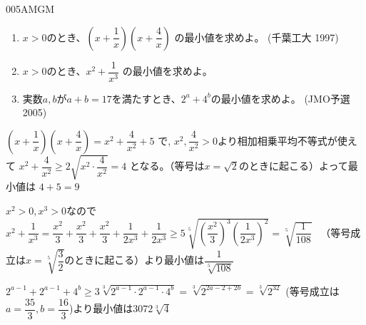 \begin{prob}{005}{}{AMGM}
 \begin{enumerate}
  \item $x>0$のとき、$\left(x+\dfrac{1}{x}\right)\left(x+\dfrac{4}{x}\right)$ の最小値を求めよ。 (千葉工大 1997)
  \item $x>0$のとき、$x^2+\dfrac{1}{x^3}$ の最小値を求めよ。
  \item 実数$a,b$が$a+b=17$を満たすとき、$2^a+4^b$の最小値を求めよ。 (JMO予選 2005)
 \end{enumerate}
\end{prob}
$\left(x+\dfrac{1}{x}\right)\left(x+\dfrac{4}{x}\right)=x^2+\dfrac{4}{x^2}+5$ で, $x^2,\dfrac{4}{x^2}>0$より相加相乗平均不等式が使えて $x^2+\dfrac{4}{x^2}\geq 2\sqrt{x^2\cdot \dfrac{4}{x^2}}=4$ となる。（等号は$x=\sqrt{2}$のときに起こる）よって最小値は $4+5=9$

$x^2>0, x^3>0$なので$x^2+\dfrac{1}{x^3}=\dfrac{x^2}{3}+\dfrac{x^2}{3}+\dfrac{x^2}{3}+\dfrac{1}{2x^3}+\dfrac{1}{2x^3}\geq 5\sqrt[5]{\left(\dfrac{x^2}{3}\right)^3\left(\dfrac{1}{2x^3}\right)^2}=\sqrt[5]{\dfrac{1}{108}}$ 　（等号成立は$x=\sqrt[5]{\dfrac{3}{2}}$のときに起こる）より最小値は$\dfrac{1}{\sqrt[5]{108}}$

$2^{a-1}+2^{a-1}+4^b\geq 3\sqrt[3]{2^{a-1}\cdot 2^{a-1}\cdot 4^b}=\sqrt[3]{2^{2a-2+2b}}=\sqrt[3]{2^{32}}$ (等号成立は$a=\dfrac{35}{3}, b=\dfrac{16}{3}$)より最小値は$3072\sqrt[3]{4}$

